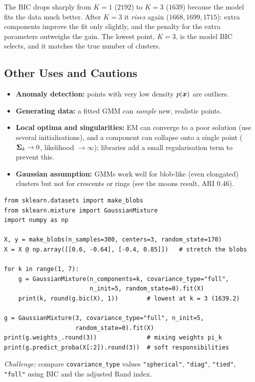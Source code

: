 \begin{explain}
The BIC drops sharply from $K=1$ ($2192$) to $K=3$ ($1639$) because the model fits the data much better. After $K=3$ it \emph{rises} again ($1668,1699,1715$): extra components improve the fit only slightly, and the penalty for the extra parameters outweighs the gain. The lowest point, $K=3$, is the model BIC selects, and it matches the true number of clusters.
\end{explain}

\subsection{Other Uses and Cautions}

\begin{itemize}
  \item \textbf{Anomaly detection:} points with very low density $p(\boldsymbol{x})$ are outliers.
  \item \textbf{Generating data:} a fitted GMM can \emph{sample} new, realistic points.
  \item \textbf{Local optima and singularities:} EM can converge to a poor solution (use several initialisations), and a component can collapse onto a single point ($\boldsymbol{\Sigma}_k\to0$, likelihood $\to\infty$); libraries add a small regularisation term to prevent this.
  \item \textbf{Gaussian assumption:} GMMs work well for blob-like (even elongated) clusters but not for crescents or rings (see the moons result, ARI $0.46$).
\end{itemize}

\begin{tryit}
\begin{lstlisting}
from sklearn.datasets import make_blobs
from sklearn.mixture import GaussianMixture
import numpy as np

X, y = make_blobs(n_samples=300, centers=3, random_state=170)
X = X @ np.array([[0.6, -0.64], [-0.4, 0.85]])   # stretch the blobs

for k in range(1, 7):
    g = GaussianMixture(n_components=k, covariance_type="full",
                        n_init=5, random_state=0).fit(X)
    print(k, round(g.bic(X), 1))        # lowest at k = 3 (1639.2)

g = GaussianMixture(3, covariance_type="full", n_init=5,
                    random_state=0).fit(X)
print(g.weights_.round(3))              # mixing weights pi_k
print(g.predict_proba(X[:2]).round(3))  # soft responsibilities
\end{lstlisting}
\emph{Challenge:} compare \texttt{covariance\_type} values \texttt{"spherical"}, \texttt{"diag"}, \texttt{"tied"}, \texttt{"full"} using BIC and the adjusted Rand index.
\end{tryit}

